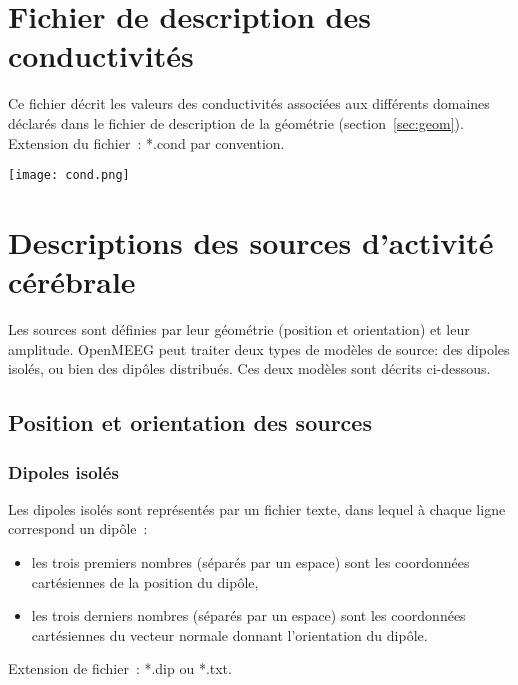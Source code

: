 \section{Fichier de description des conductivités}
\label{sec:cond}

\noindent
Ce fichier décrit les valeurs des conductivités associées aux différents domaines déclarés dans le fichier de description de la
géométrie (section~\ref{sec:geom}).\\ 
Extension du fichier~: *.cond par convention.\\

\centerline{\texttt{[image: cond.png]}}




\section{Descriptions des sources d'activité cérébrale}
Les sources sont définies par leur géométrie (position et orientation) et leur amplitude.
OpenMEEG peut traiter deux types de modèles de source: des dipoles isolés, ou bien des dipôles distribués.
Ces deux modèles sont décrits ci-dessous.

\subsection{Position et orientation des sources}
\label{sec:dipoles}
\subsubsection{Dipoles isolés}
\noindent
Les dipoles isolés sont représentés par un fichier texte, dans lequel à chaque ligne correspond un dipôle~: 
\begin{itemize}
    \item les trois premiers nombres (séparés par un espace) sont les coordonnées cartésiennes de la position du dipôle,
    \item les trois derniers nombres (séparés par un espace) sont les coordonnées cartésiennes du vecteur normale donnant
           l'orientation du dipôle.
\end{itemize}
Extension de fichier~: *.dip ou *.txt.

